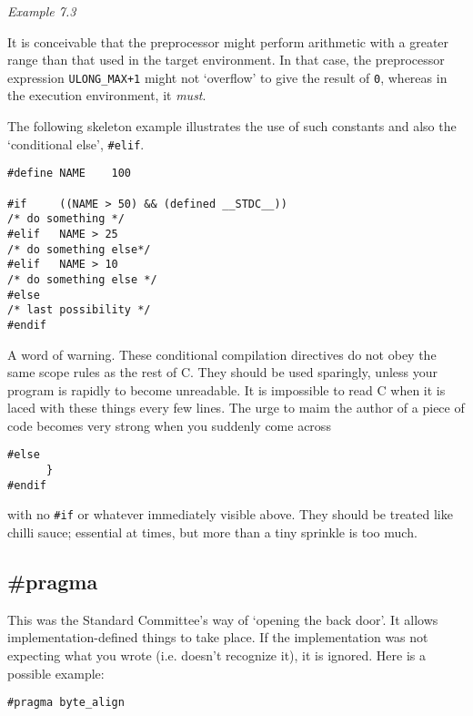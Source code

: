    \begin{center}\textit{Example 7.3}\end{center}


   It is conceivable that the preprocessor might perform arithmetic with
    a greater range than that used in the target environment. In that case,
    the preprocessor expression \texttt{ULONG\_MAX+1} might not
    `overflow' to give the result of \texttt{0}, whereas in the
    execution environment, it \textit{must}.


   The following skeleton example illustrates the use of such constants
    and also the `conditional else', \texttt{\#elif}.


   \begin{Verbatim}
#define NAME    100

#if     ((NAME > 50) && (defined __STDC__))
/* do something */
#elif   NAME > 25
/* do something else*/
#elif   NAME > 10
/* do something else */
#else
/* last possibility */
#endif
\end{Verbatim}

   A word of warning. These conditional compilation directives do not
    obey the same scope rules as the rest of C. They should be used
    sparingly, unless your program is rapidly to become unreadable. It is
    impossible to read C when it is laced with these things every few lines.
    The urge to maim the author of a piece of code becomes very strong when
    you suddenly come across


   \begin{Verbatim}
#else
      }
#endif
\end{Verbatim}

   with no \texttt{\#if} or whatever immediately visible above. They
    should be treated like chilli sauce; essential at times, but more than
    a tiny sprinkle is too much.


  

  \subsection{\#pragma}
   

   This was the Standard Committee's way of `opening the back
    door'. It allows implementation-defined things to take place. If the
    implementation was not expecting what you wrote (i.e. doesn't recognize
    it), it is ignored. Here is a possible example:


   \begin{Verbatim}
#pragma byte_align
\end{Verbatim}

